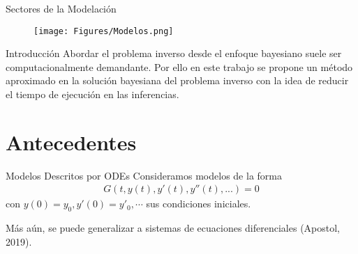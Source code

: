 \documentclass[10pt,aspectratio=169]{beamer}
\begin{document}
\begin{frame}[fragile]{Sectores de la Modelación}

  \begin{figure}[H] 
      \centering 
      \texttt{[image: Figures/Modelos.png]} 
  \end{figure} 

\end{frame}


\begin{frame}{Introducción}
  Abordar el problema inverso desde el enfoque bayesiano suele ser computacionalmente demandante. Por ello en este trabajo se propone un método aproximado en la solución bayesiana del problema inverso con la idea de reducir el tiempo de ejecución en las inferencias.
  
\end{frame}


\section{Antecedentes}

\begin{frame}{Modelos Descritos por ODEs}
  Consideramos modelos de la forma
  \begin{align*}
    G(t,y(t),y'(t),y''(t),...) = 0
  \end{align*}
  con $y(0)=y_0, y'(0)= y'_0, \cdots$ sus condiciones iniciales.

  Más aún, se puede generalizar a sistemas de ecuaciones diferenciales (Apostol, 2019).
\end{frame}
\end{document}
